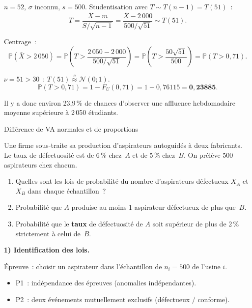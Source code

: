 \documentclass[11pt,a4paper]{article}
\newcommand{\N}{\mathcal{N}}
\newcommand{\Prob}{\mathbb{P}}
\newcommand{\appN}{\overset{c}{\approx}}
\renewcommand{\P}{\Prob}
\newcommand{\corrsep}{\vspace{4pt}{\color{rulecol}\hrule height 0.6pt}\vspace{6pt}}
\begin{document}
\corrsep

$n=52$, $\sigma$ inconnu, $s=500$. Studentisation avec $T \sim T(n-1)=T(51)$~:
$$T = \frac{\bar{X}-m}{S/\sqrt{n-1}} = \frac{\bar{X}-2\,000}{500/\sqrt{51}} \sim T(51).$$

Centrage~:
$$\P(\bar{X}>2\,050) = \P\!\left(T > \frac{2\,050-2\,000}{500/\sqrt{51}}\right)
  = \P\!\left(T > \frac{50\sqrt{51}}{500}\right) = \P(T > 0{,}71).$$

\begin{methbox}[Convergence]
$\nu = 51>30$~: $T(51)\appN\N(0;1)$.
$$\P(T>0{,}71) = 1-F_U(0{,}71) = 1 - 0{,}76115 = \mathbf{0{,}23885}.$$
\end{methbox}

Il y a donc environ 23,9\,\% de chances d'observer une affluence hebdomadaire moyenne sup\'erieure \`a 2\,050 \'etudiants.

\begin{exercice}{Diff\'erence de VA normales et de proportions}

Une firme sous-traite sa production d'aspirateurs autoguid\'es \`a deux fabricants. Le taux de d\'efectuosit\'e est de 6\,\% chez~$A$ et de 5\,\% chez~$B$. On pr\'el\`eve 500 aspirateurs chez chacun.

\begin{enumerate}
  \item Quelles sont les lois de probabilit\'e du nombre d'aspirateurs d\'efectueux $X_A$ et $X_B$ dans chaque \'echantillon~?
  \item Probabilit\'e que $A$ produise au moins 1 aspirateur d\'efectueux de plus que~$B$.
  \item Probabilit\'e que le \textbf{taux} de d\'efectuosit\'e de $A$ soit sup\'erieur de plus de 2\,\% strictement \`a celui de~$B$.
\end{enumerate}
\end{exercice}

\corrsep

\textbf{1) Identification des lois.}

\'Epreuve~: choisir un aspirateur dans l'\'echantillon de $n_i=500$ de l'usine $i$.
\begin{itemize}
  \item P1~: ind\'ependance des \'epreuves (anomalies ind\'ependantes). \checkmark
  \item P2~: deux \'ev\'enements mutuellement exclusifs (d\'efectueux / conforme). \checkmark
\end{itemize}
\end{document}
